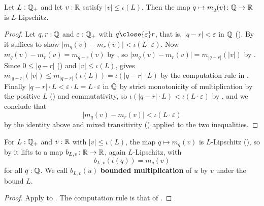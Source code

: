 \begin{lemma}
  \label{flipScaleIsLipschitzWith}
  Let $L : \mathbb{Q}_{+}$ and let $v : \mathbb{R}$ satisfy $\lvert v \rvert \le \iota(L)$. Then the map $q \mapsto m_q(v) \colon \mathbb{Q} \to \mathbb{R}$ is $L$-Lipschitz.
\end{lemma}
\begin{proof}
  Let $q, r : \mathbb{Q}$ and $\varepsilon : \mathbb{Q}_{+}$ with $q \close{\varepsilon} r$, that is, $\lvert q - r \rvert < \varepsilon$ in $\mathbb{Q}$ (). By  it suffices to show $\lvert m_q(v) - m_r(v) \rvert < \iota(L \cdot \varepsilon)$. Now $m_q(v) - m_r(v) = m_{q-r}(v)$ by , so $\lvert m_q(v) - m_r(v) \rvert = m_{\lvert q-r \rvert}(\lvert v \rvert)$ by . Since $0 \le \lvert q - r \rvert$ () and $\lvert v \rvert \le \iota(L)$,  gives $m_{\lvert q-r \rvert}(\lvert v \rvert) \le m_{\lvert q-r \rvert}(\iota(L)) = \iota(\lvert q - r \rvert \cdot L)$ by the computation rule in . Finally $\lvert q - r \rvert \cdot L < \varepsilon \cdot L = L \cdot \varepsilon$ in $\mathbb{Q}$ by strict monotonicity of multiplication by the positive $L$ () and commutativity, so $\iota(\lvert q - r \rvert \cdot L) < \iota(L \cdot \varepsilon)$ by , and we conclude that
  \[
    \lvert m_q(v) - m_r(v) \rvert < \iota(L \cdot \varepsilon)
  \]
  by the identity above and mixed transitivity () applied to the two inequalities.
\end{proof}

\begin{definition}
  \label{boundedMul}
  For $L : \mathbb{Q}_{+}$ and $v : \mathbb{R}$ with $\lvert v \rvert \le \iota(L)$, the map $q \mapsto m_q(v)$ is $L$-Lipschitz (), so by  it lifts to a map $b_{L,v} \colon \mathbb{R} \to \mathbb{R}$, again $L$-Lipschitz, with
  \[
    b_{L,v}(\iota(q)) = m_q(v)
  \]
  for all $q : \mathbb{Q}$. We call $b_{L,v}(u)$ \textbf{bounded multiplication} of $u$ by $v$ under the bound $L$.
\end{definition}
\begin{proof}
  Apply  to . The computation rule is that of .
\end{proof}

